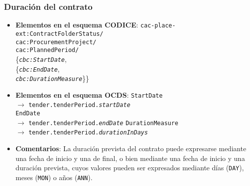         \subsubsection{Duración del contrato}
            \begin{itemize}
                \item \textbf{Elementos en el esquema CODICE}:
                    \tabto{7.7cm} \texttt{cac-place-ext:ContractFolderStatus/} \\
                    \tabto{7.7cm} \texttt{cac:ProcurementProject/} \\
                    \tabto{7.7cm} \texttt{cac:PlannedPeriod/} \\
                    \tabto{7.7cm} \{\texttt{\textit{cbc:StartDate}}, \\
                    \tabto{7.7cm} \{\texttt{\textit{cbc:EndDate}}, \\
                    \tabto{7.7cm} \texttt{\textit{cbc:DurationMeasure}}\}\}
                \item \textbf{Elementos en el esquema OCDS}:
                    \tabto{7.7cm} \texttt{StartDate} \\ \tabto{8cm} $\rightarrow$ \texttt{tender.tenderPeriod.\textit{startDate}} \\
                    \tabto{7.7cm} \texttt{EndDate} \\ \tabto{8cm} $\rightarrow$ \texttt{tender.tenderPeriod.\textit{endDate}}
                    \tabto{7.7cm} \texttt{DurationMeasure} \\ \tabto{8cm} $\rightarrow$ \texttt{tender.tenderPeriod.\textit{durationInDays}}
                \item \textbf{Comentarios}: La duración prevista del contrato puede expresarse mediante una fecha de inicio y una de final, o bien mediante una fecha de inicio y una duración prevista, cuyos valores pueden ser expresados mediante días (\texttt{DAY}), meses (\texttt{MON}) o años (\texttt{ANN}).
            \end{itemize}
        
